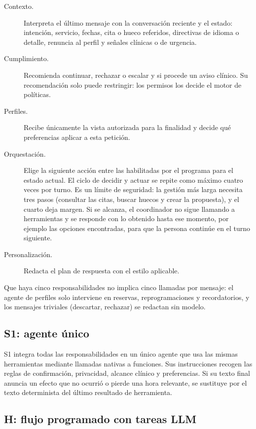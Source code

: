 \begin{description}
  \item[Contexto.] Interpreta el último mensaje con la conversación reciente y el
  estado: intención, servicio, fechas, cita o hueco referidos, directivas de
  idioma o detalle, renuncia al perfil y señales clínicas o de urgencia.
  \item[Cumplimiento.] Recomienda continuar, rechazar o escalar y si procede un
  aviso clínico. Su recomendación solo puede restringir: los permisos los
  decide el motor de políticas.
  \item[Perfiles.] Recibe únicamente la vista autorizada para la finalidad y
  decide qué preferencias aplicar a esta petición.
  \item[Orquestación.] Elige la siguiente acción entre las habilitadas por el
  programa para el estado actual. El ciclo de decidir y actuar se repite como
  máximo cuatro veces por turno. Es un límite de seguridad: la gestión más larga
  necesita tres pasos (consultar las citas, buscar huecos y crear la propuesta),
  y el cuarto deja margen. Si se alcanza, el coordinador no sigue llamando a
  herramientas y se responde con lo obtenido hasta ese momento, por ejemplo las
  opciones encontradas, para que la persona continúe en el turno siguiente.
  \item[Personalización.] Redacta el plan de respuesta con el estilo aplicable.
\end{description}

Que haya cinco responsabilidades no implica cinco llamadas por mensaje: el
agente de perfiles solo interviene en reservas, reprogramaciones y
recordatorios, y los mensajes triviales (descartar, rechazar) se redactan sin
modelo.

\subsection{S1: agente único}

S1 integra todas las responsabilidades en un único agente que usa las mismas
herramientas mediante llamadas nativas a funciones. Sus instrucciones recogen
las reglas de confirmación, privacidad, alcance clínico y preferencias. Si su
texto final anuncia un efecto que no ocurrió o pierde una hora relevante, se
sustituye por el texto determinista del último resultado de herramienta.

\subsection{H: flujo programado con tareas LLM}

